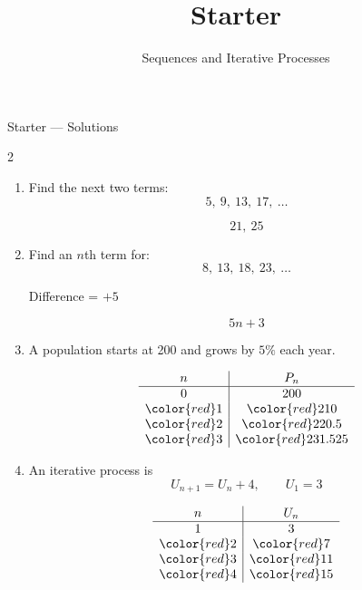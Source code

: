 \documentclass{beamer}
\title{Starter}
\subtitle{Sequences and Iterative Processes}
\begin{document}
\begin{frame}{Starter --- Solutions}

\small

\begin{multicols}{2}

\begin{enumerate}

\item Find the next two terms:
\[
5,\ 9,\ 13,\ 17,\ \dots
\]

{\color{red}
\[
21,\ 25
\]
}

\vspace{0.4cm}

\item Find an $n$th term for:
\[
8,\ 13,\ 18,\ 23,\ \dots
\]

{\color{red}
Difference = \(+5\)

\[
5n + 3
\]
}

\vspace{0.4cm}

\item A population starts at 200 and grows by \(5\%\) each year.

\[
\begin{array}{c|c}
n & P_n \\
\hline
0 & 200 \\
{\color{red}1} & {\color{red}210} \\
{\color{red}2} & {\color{red}220.5} \\
{\color{red}3} & {\color{red}231.525}
\end{array}
\]

\vspace{0.4cm}

\item An iterative process is
\[
U_{n+1} = U_n + 4, \qquad U_1 = 3
\]

\[
\begin{array}{c|c}
n & U_n \\
\hline
1 & 3 \\
{\color{red}2} & {\color{red}7} \\
{\color{red}3} & {\color{red}11} \\
{\color{red}4} & {\color{red}15}
\end{array}
\]

\end{enumerate}

\end{multicols}

\end{frame}
\end{document}
